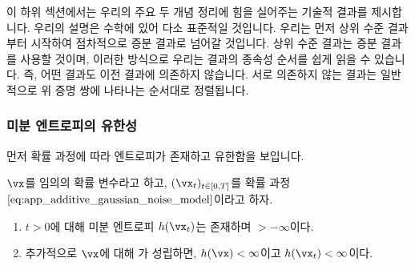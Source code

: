 \documentclass[../../book-main_ko.tex]{subfiles}
\begin{document}
이 하위 섹션에서는 우리의 주요 두 개념 정리에 힘을 실어주는 기술적 결과를 제시합니다. 우리의 설명은 수학에 있어 다소 표준적일 것입니다. 우리는 먼저 상위 수준 결과부터 시작하여 점차적으로 증분 결과로 넘어갈 것입니다. 상위 수준 결과는 증분 결과를 사용할 것이며, 이러한 방식으로 우리는 결과의 종속성 순서를 쉽게 읽을 수 있습니다. 즉, 어떤 결과도 이전 결과에 의존하지 않습니다. 서로 의존하지 않는 결과는 일반적으로 위 증명 쌍에 나타나는 순서대로 정렬됩니다. 


\subsubsection{미분 엔트로피의 유한성}

먼저 확률 과정에 따라 엔트로피가 존재하고 유한함을 보입니다.

\begin{lemma}\label{lem:diffusion_entropy_exists}
    \(\vx\)를 임의의 확률 변수라고 하고, \((\vx_{t})_{t \in [0, T]}\)를 확률 과정 \(\eqref{eq:app_additive_gaussian_noise_model}\)이라고 하자. 
    \begin{enumerate}
        \item \(t > 0\)에 대해 미분 엔트로피 \(h(\vx_{t})\)는 존재하며 \(> -\infty\)이다.
        \item 추가적으로 \(\vx\)에 대해 가 성립하면, \(h(\vx) < \infty\)이고 \(h(\vx_{t})< \infty\)이다.
    \end{enumerate}
\end{lemma}
\end{document}
